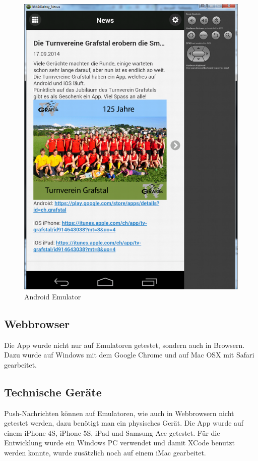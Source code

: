 \begin{figure}[h]
\centering
\includegraphics[scale=0.25]{images/android_emulator.png}
\caption{Android Emulator}
\label{fig:android_emulator}
\end{figure}

\FloatBarrier
\subsection{Webbrowser}
Die App wurde nicht nur auf Emulatoren getestet, sondern auch in Browsern. Dazu wurde auf Windows mit dem Google Chrome und auf Mac OSX mit Safari gearbeitet.

\subsection{Technische Geräte}
Push-Nachrichten können auf Emulatoren, wie auch in Webbrowsern nicht getestet werden, dazu benötigt man ein physisches Gerät. Die App wurde auf einem iPhone 4S, iPhone 5S, iPad und Samsung Ace getestet. Für die Entwicklung wurde ein Windows PC verwendet und damit XCode benutzt werden konnte, wurde zusätzlich noch auf einem iMac gearbeitet.

